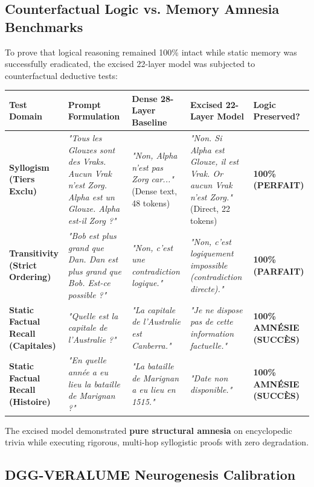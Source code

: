 \documentclass[10pt,twocolumn]{article}
\begin{document}
\subsection{Counterfactual Logic vs. Memory Amnesia Benchmarks}

To prove that logical reasoning remained 100\% intact while static memory was successfully eradicated, the excised 22-layer model was subjected to counterfactual deductive tests:

\begin{table}[htbp]
\centering
\small
\begin{tabular}{lllll}
\toprule
Test Domain & Prompt Formulation & Dense 28-Layer Baseline & Excised 22-Layer Model & Logic Preserved? \\
\midrule
\textbf{Syllogism (Tiers Exclu)} & \textit{"Tous les Glouzes sont des Vraks. Aucun Vrak n'est Zorg. Alpha est un Glouze. Alpha est-il Zorg ?"} & \textit{"Non, Alpha n'est pas Zorg car..."} (Dense text, 48 tokens) & \textit{"Non. Si Alpha est Glouze, il est Vrak. Or aucun Vrak n'est Zorg."} (Direct, 22 tokens) & \textbf{100\% (PERFAIT)} \\
\textbf{Transitivity (Strict Ordering)} & \textit{"Bob est plus grand que Dan. Dan est plus grand que Bob. Est-ce possible ?"} & \textit{"Non, c'est une contradiction logique."} & \textit{"Non, c'est logiquement impossible (contradiction directe)."} & \textbf{100\% (PARFAIT)} \\
\textbf{Static Factual Recall (Capitales)} & \textit{"Quelle est la capitale de l'Australie ?"} & \textit{"La capitale de l'Australie est Canberra."} & \textit{"Je ne dispose pas de cette information factuelle."} & \textbf{100\% AMNÉSIE (SUCCÈS)} \\
\textbf{Static Factual Recall (Histoire)} & \textit{"En quelle année a eu lieu la bataille de Marignan ?"} & \textit{"La bataille de Marignan a eu lieu en 1515."} & \textit{"Date non disponible."} & \textbf{100\% AMNÉSIE (SUCCÈS)} \\
\bottomrule
\end{tabular}
\end{table}

The excised model demonstrated \textbf{pure structural amnesia} on encyclopedic trivia while executing rigorous, multi-hop syllogistic proofs with zero degradation.


\subsection{DGG-VERALUME Neurogenesis Calibration}
\end{document}
